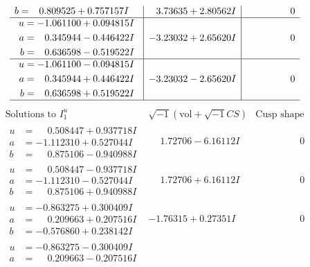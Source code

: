 \documentclass[1p]{elsarticle_modified}
\theoremstyle{definition}
\newcommand{\I}{\sqrt{-1}}
\begin{document}
$$\begin{array}{c|c|c}
\begin{aligned}
b &= \phantom{-}0.809525 + 0.757157 I\end{aligned}
 & \phantom{-}3.73635 + 2.80562 I & \phantom{-0.000000 } 0 \\ \hline\begin{aligned}
u &= -1.061100 + 0.094815 I \\
a &= \phantom{-}0.345944 - 0.446422 I \\
b &= \phantom{-}0.636598 - 0.519522 I\end{aligned}
 & -3.23032 + 2.65620 I & \phantom{-0.000000 } 0 \\ \hline\begin{aligned}
u &= -1.061100 - 0.094815 I \\
a &= \phantom{-}0.345944 + 0.446422 I \\
b &= \phantom{-}0.636598 + 0.519522 I\end{aligned}
 & -3.23032 - 2.65620 I & \phantom{-0.000000 } 0\\
 \hline 
 \end{array}$$\newpage$$\begin{array}{c|c|c}  
\text{Solutions to }I^u_{1}& \I (\text{vol} + \sqrt{-1}CS) & \text{Cusp shape}\\
 \hline 
\begin{aligned}
u &= \phantom{-}0.508447 + 0.937718 I \\
a &= -1.112310 + 0.527044 I \\
b &= \phantom{-}0.875106 - 0.940988 I\end{aligned}
 & \phantom{-}1.72706 - 6.16112 I & \phantom{-0.000000 } 0 \\ \hline\begin{aligned}
u &= \phantom{-}0.508447 - 0.937718 I \\
a &= -1.112310 - 0.527044 I \\
b &= \phantom{-}0.875106 + 0.940988 I\end{aligned}
 & \phantom{-}1.72706 + 6.16112 I & \phantom{-0.000000 } 0 \\ \hline\begin{aligned}
u &= -0.863275 + 0.300409 I \\
a &= \phantom{-}0.209663 + 0.207516 I \\
b &= -0.576860 + 0.238142 I\end{aligned}
 & -1.76315 + 0.27351 I & \phantom{-0.000000 } 0 \\ \hline\begin{aligned}
u &= -0.863275 - 0.300409 I \\
a &= \phantom{-}0.209663 - 0.207516 I \\

\end{aligned}
\end{array}$$
\end{document}
